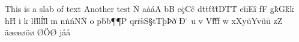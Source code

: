 This is {a} slab of text
Another test \tdot \.N
a\a \.a\adot \'aA bB c\c \.cC\^c d\.t\tbar \=t\tdot \'t\tflag \~t\tring \^tD\.T\D \"T
e\.i\e \=iE\^i fF g\.kG\'k\g \=k h\h H i k l\l \.l\lbar \=l\ldot \'l\lflag \~l\lring \^l m\m 
n\n \.n\ndot \'nN\N \.N o p\"b\p \.b\P  \Pdots \"\P  P q\q \Q r\rdot \.r\r 
sS\S  tT\T \th þ\TH Þ\thth \dh ð \.\th \DH Ð \.\TH 
u v V\.f\v \'f\V \~f w x\x X\X y\.uYv\y \"u\Y \=u
z\z Z äæ\ae \o öø \O ÖØ \oo \oO \ey \arlaug \tvimadur \belgthor jå\aa 

